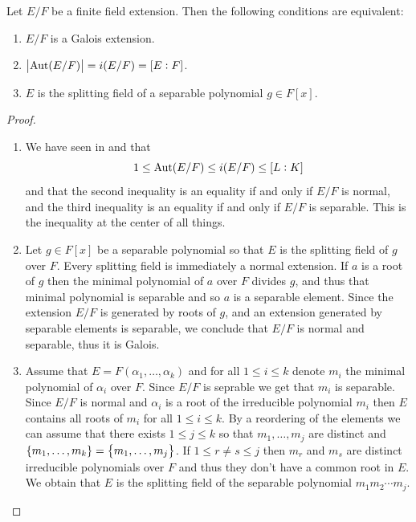 \documentclass[11pt,a4paper]{article}
\begin{document}
\begin{proposition}
  \label{prop:quivalent-galois-conditions-for-finite-extensions}
  Let $E/F$ be a finite field extension.
  Then the following conditions are equivalent:
  \begin{enumerate}
    \item[(1)] $E/F$ is a Galois extension.
    \item[(2)] $\left\lvert\operatorname{Aut}(E/F)\right\rvert = i(E/F) = [E : F]$.
    \item[(3)] $E$ is the splitting field of
      a separable polynomial $g \in F[x]$.
  \end{enumerate}
\end{proposition}
\begin{proof} \phantom{}
  \begin{enumerate}
    \item[$(1 \leftrightarrow 2)$]
      We have seen in  and  that
      \[
        1 \le
        \operatorname{Aut}(E/F) \le 
        i(E/F) \le
        [L : K]
      \]
      and that the second inequality is an equality if and only if $E/F$
      is normal, and the third inequality is an equality if and only if $E/F$
      is separable.
      This is the inequality at the center of all things.
    \item[$(3 \to 1)$]
      Let $g \in F[x]$ be a separable polynomial so that $E$ is the splitting
      field of $g$ over $F$.
      Every splitting field is immediately a normal extension.
      If $a$ is a root of $g$ then the minimal polynomial of $a$ over $F$
      divides $g$, and thus that minimal polynomial
      is separable and so $a$ is a separable element.
      Since the extension $E/F$ is generated by roots of $g$,
      and an extension generated by separable elements is separable,
      we conclude that $E/F$ is normal and separable, thus it is Galois.
    \item[$(1 \to 3)$] Assume that $E = F(\alpha_1,\dots,\alpha_k)$
      and for all $1 \le i \le k$ denote $m_i$ the minimal polynomial
      of $\alpha_i$ over $F$.
      Since $E/F$ is seprable we get that $m_i$ is separable.
      Since $E/F$ is normal and $\alpha_i$ is a root of
      the irreducible polynomial $m_i$ then $E$
      contains all roots of $m_i$ for all $1 \le i \le k$.
      By a reordering of the elements we can assume that
      there exists $1 \le j \le k$ so that $m_1,\dots,m_j$
      are distinct and $\left\{m_1,\dots,m_k\right\} = \left\{m_1,\dots,m_j\right\}$.
      If $1 \le r \neq s \le j$ then $m_r$ and $m_s$ are distinct
      irreducible polynomials over $F$ and thus they don't have a common
      root in $E$.
      We obtain that $E$ is the splitting field of the separable
      polynomial $m_1 m_2 \cdots m_j$.
  \end{enumerate}
\end{proof}
\end{document}

